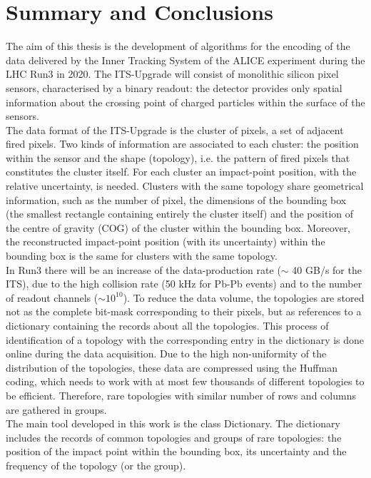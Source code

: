 \chapter{Summary and Conclusions}
The aim of this thesis is the development of algorithms for the encoding of the data delivered by the Inner Tracking System of the ALICE experiment during the LHC Run3 in 2020. The ITS-Upgrade will consist of monolithic silicon pixel sensors, characterised by a binary readout: the detector provides only spatial information about the crossing point of charged particles within the surface of the sensors.\\
The data format of the ITS-Upgrade is the cluster of pixels, a set of adjacent fired pixels. Two kinds of information are associated to each cluster: the position within the sensor and the shape (topology), i.e. the pattern of fired pixels that constitutes the cluster itself. For each cluster an impact-point position, with the relative uncertainty, is needed. Clusters with the same topology share geometrical information, such as the number of pixel, the dimensions of the bounding box (the smallest rectangle containing entirely the cluster itself) and the position of the centre of gravity (COG) of the cluster within the bounding box. Moreover, the reconstructed impact-point position (with its uncertainty) within the bounding box is the same for clusters with the same topology.\\
In Run3 there will be an increase of the data-production rate ($\sim$ 40 GB/s for the ITS), due to the high collision rate (50 kHz for Pb-Pb events) and to the number of readout channels ($\sim 10^{10}$). To reduce the data volume, the topologies are stored not as the complete bit-mask corresponding to their pixels, but as references to a dictionary containing the records about all the topologies. This process of identification of a topology with the corresponding entry in the dictionary is done online during the data acquisition. Due to the high non-uniformity of the distribution of the topologies, these data are compressed using the Huffman coding, which needs to work with at most few thousands of different topologies to be efficient. Therefore, rare topologies with similar number of rows and columns are gathered in groups.\\
The main tool developed in this work is the class Dictionary. The dictionary includes the records of common topologies and groups of rare topologies: the position of the impact point within the bounding box, its uncertainty and the frequency of the topology (or the group).\\ 
